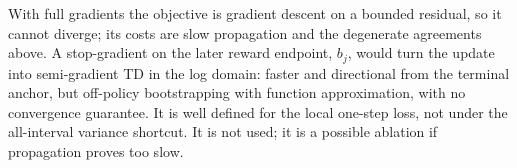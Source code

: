 \documentclass{article}
\begin{document}
With full gradients the objective is gradient descent on a bounded residual, so it cannot diverge; its
costs are slow propagation and the degenerate agreements above. A stop-gradient on the later reward
endpoint, $b_j$, would turn the update into semi-gradient TD in the log domain: faster and directional from
the terminal anchor, but off-policy bootstrapping with function approximation, with no convergence
guarantee. It is well defined for the local one-step loss, not under the all-interval variance shortcut.
It is not used; it is a possible ablation if propagation proves too slow.
\end{document}
